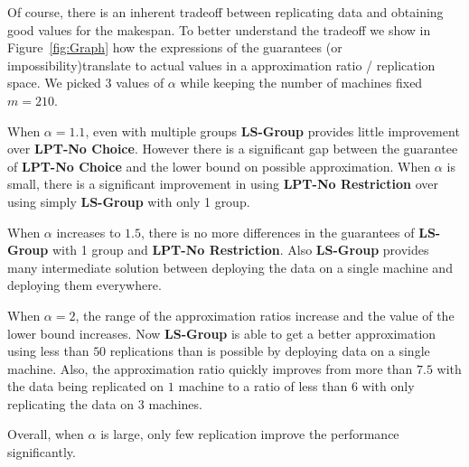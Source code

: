   
  Of course, there is an inherent tradeoff between replicating data and   obtaining good values for the makespan. To better understand the   tradeoff we show in Figure~\ref{fig:Graph} how the expressions of the   guarantees (or impossibility)translate to actual values in a  approximation ratio / replication space.  We picked 3 values of   $\alpha$ while keeping the number of machines fixed $m=210$. 
  
  When $\alpha=1.1$, even with multiple groups {\bf LS-Group} provides little improvement over {\bf LPT-No Choice}. However there is a significant  gap between the guarantee of {\bf LPT-No Choice} and the lower bound  on possible approximation. When $\alpha$ is small, there is a  significant improvement in using {\bf LPT-No Restriction} over using  simply {\bf LS-Group} with only 1 group.
  
  When $\alpha$ increases to $1.5$, there is no more differences in the  guarantees of {\bf LS-Group} with 1 group and {\bf LPT-No
    Restriction}. Also {\bf LS-Group} provides many intermediate  solution between deploying the data on a single machine and deploying
  them everywhere.
  
  When $\alpha=2$, the range of the approximation ratios increase and
  the value of the lower bound increases. Now {\bf LS-Group} is able to
  get a better approximation using less than $50$ replications than is
  possible by deploying data on a single machine. Also, the
  approximation ratio quickly improves from more than $7.5$ with the
  data being replicated on $1$ machine to a ratio of less than $6$ with
  only replicating the data on $3$ machines.
  
  Overall, when $\alpha$ is large, only few replication improve the
  performance significantly.
  
